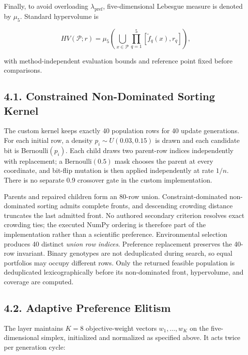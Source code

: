 \documentclass[
  10pt,
  a4paper,
]{article}
\begin{document}
Finally, to avoid overloading \(\lambda_{\mathrm{pref}}\),
five-dimensional Lebesgue measure is denoted by \(\mu_5\). Standard
hypervolume is

\[
HV(\mathcal P;r)=\mu_5\!\left(
\bigcup_{x\in\mathcal P}\prod_{q=1}^{5}[\tilde f_q(x),r_q]\right),
\]

with method-independent evaluation bounds and reference point fixed
before comparisons.

\subsection{4.1. Constrained Non-Dominated Sorting
Kernel}\label{constrained-non-dominated-sorting-kernel}

The custom kernel keeps exactly 40 population rows for 40 update
generations. For each initial row, a density \(p_i\sim U(0.03,0.15)\) is
drawn and each candidate bit is Bernoulli\((p_i)\). Each child draws two
parent-row indices independently with replacement; a Bernoulli\((0.5)\)
mask chooses the parent at every coordinate, and bit-flip mutation is
then applied independently at rate \(1/n\). There is no separate 0.9
crossover gate in the custom implementation.

Parents and repaired children form an 80-row union. Constraint-dominated
non-dominated sorting admits complete fronts, and descending crowding
distance truncates the last admitted front. No authored secondary
criterion resolves exact crowding ties; the executed NumPy ordering is
therefore part of the implementation rather than a scientific
preference. Environmental selection produces 40 distinct \emph{union row
indices}. Preference replacement preserves the 40-row invariant. Binary
genotypes are not deduplicated during search, so equal portfolios may
occupy different rows. Only the returned feasible population is
deduplicated lexicographically before its non-dominated front,
hypervolume, and coverage are computed.

\subsection{4.2. Adaptive Preference
Elitism}\label{adaptive-preference-elitism}

The layer maintains \(K=8\) objective-weight vectors \(w_1,\ldots,w_K\)
on the five-dimensional simplex, initialized and normalized as specified
above. It acts twice per generation cycle:
\end{document}
